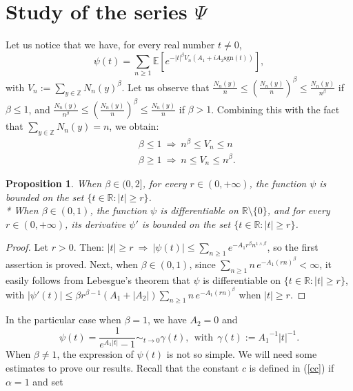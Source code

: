 \documentclass[oneside, a4paper,11pt,reqno]{amsart}
\newtheorem{prop}[hypo]{Proposition}
\begin{document}
\section{Study of the series $\Psi$}
Let us notice that we have, for every real number $t\neq 0$,
\begin{equation}\label{def-psi}
\psi(t) =\sum_{n\ge 1} {\mathbb E}[e^{-|t|^\beta V_n (A_1+i A_2\text{sgn}(t) )}],
\end{equation}
with $V_n:=\sum_{y\in\mathbb Z} N_n(y)^\beta$. 
Let us observe that $\frac{N_n(y)}{n} \leq (\frac{N_n(y)}{n})^\beta\le\frac {N_n(y)}{n^\beta}$ 
if $\beta \leq 1$, and 
$\frac{ N_n(y)}{n^\beta}\le 
   (\frac{N_n(y)}{n})^\beta \leq \frac{N_n(y)}{n}$ if $\beta > 1$.
Combining this with the fact that $\sum_{y\in\mathbb Z} N_n(y)=n$, we obtain: 
\begin{subequations}
\begin{eqnarray}
& & \beta \leq 1\ \Rightarrow\ n^\beta\leq V_n \leq n  \label{Vn-beta-less1} \\
& &  \beta \geq 1\ \Rightarrow\ n\leq V_n \leq n^\beta  \label{Vn-beta-less2}.
\end{eqnarray}
\end{subequations}
\begin{prop}\label{series-1-trans}
When $\beta\in (0,2]$,  for every $r\in(0,+\infty)$, the function $\psi$ is bounded on the set $\{t\in {\mathbb R} : |t|\geq r\}$.\\*
When $\beta\in (0,1)$,  the function $\psi$ is differentiable on $\mathbb R\setminus\{0\}$, and for every $r\in(0,+\infty)$,  its derivative $\psi'$ is bounded on the set $\{t\in {\mathbb R} : |t|\geq r\}$. 
\end{prop}
\begin{proof}
Let $r>0$. Then: $|t|\geq r\ \Rightarrow\ |\psi(t)| \leq  \sum_{n\geq 1} e^{-A_1 r^\beta n^{1\wedge \beta}}$, so the first assertion is proved. Next, when $\beta\in (0,1)$, since $\sum_{n\geq 1} n\, e^{-A_1(rn)^\beta} < \infty$, it easily follows from Lebesgue's theorem that $\psi$ is differentiable on $\{t\in {\mathbb R} : |t|\geq r\}$, with $|\psi'(t)| \leq  \beta r^{\beta-1}(A_1+|A_2|) \sum_{n\geq 1} n\, e^{-A_1 (rn)^\beta}$ when $|t|\geq r$.  
\end{proof}
In the particular case when $\beta=1$, we have $A_2=0$ and
$$\psi(t)=\frac 1{e^{A_1|t|} -1}\sim_{t\rightarrow 0}\gamma(t),\ \
    \mbox{with}\ \ \gamma(t):={A_1}^{-1}|t|^{-1}.$$
When $\beta\ne 1$, the expression of $\psi(t)$ is not so simple. We will need some estimates
to prove our results. Recall that the constant $c$ is defined in (\ref{cc}) if $\alpha=1$ and set
\end{document}

